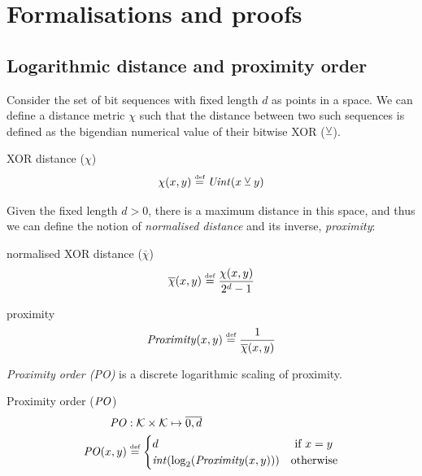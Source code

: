 
\chapter{Formalisations and proofs}\label{sec:formalisation}

\section{Logarithmic distance and proximity order \statusgreen}\label{sec:proximity}
Consider the set of bit sequences with fixed length $d$ as points in a space. We can define a distance metric $\chi$ such that
the distance between two such sequences is defined as the bigendian numerical value of their bitwise XOR ($\veebar$).

\begin{definition}{XOR distance ($\chi$)}\label{def:xor}
\begin{equation}
\chi(x, y) \overset{\textrm{\tiny def}}{=} \mathit{Uint}(x  \veebar y)
\end{equation}
\end{definition}

Given the fixed length $d>0$, there is a maximum distance in this space, and thus we can define the notion of \emph{normalised distance} and its inverse, \emph{proximity}:

\begin{definition}{normalised XOR distance ($\overline{\chi}$)}\label{def:normalisedxor}
\begin{equation}
\overline{\chi}(x, y) \overset{\textrm{\tiny def}}{=} \frac{\chi(x,y)}{2^d-1}
\end{equation}
\end{definition}

\begin{definition}{proximity}\label{def:proximity}
\begin{equation}
\mathit{Proximity}(x, y) \overset{\textrm{\tiny def}}{=} \frac{1}{\overline{\chi}(x,y)}
\end{equation}{}
\end{definition}


\emph{Proximity order (PO)} is a discrete logarithmic scaling of proximity.


\begin{definition}{Proximity order ($\mathit{PO}$)}\label{def:xorPO}
\begin{equation}
\begin{split}
\mathit{PO}&: \mathcal{K} \times\mathcal{K}\mapsto \overline{0,d}\\
\mathit{PO}(x,y) &\overset{\textrm{\tiny def}}{=} 
\begin{cases}
d & \text{ if } x=y\\
\mathit{int}(\log_2(\mathit{Proximity}(x, y)))&\text{otherwise}\\
\end{cases}
\end{split}
\end{equation}
\end{definition}


